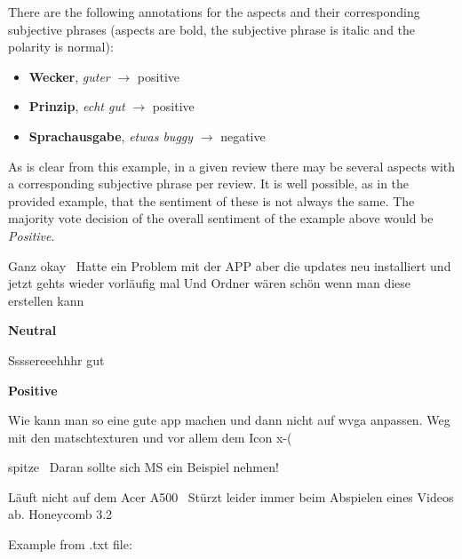 There are the following annotations for the aspects and their corresponding subjective phrases
(aspects are bold, the subjective phrase is italic and the polarity is normal):


\begin{itemize}
  \item \textbf{Wecker}, \textit{guter} $\rightarrow$ positive
  \item \textbf{Prinzip}, \textit{echt gut} $\rightarrow$ positive
  \item \textbf{Sprachausgabe}, \textit{etwas buggy} $\rightarrow$ negative
\end{itemize}

As is clear from this example, in a given review there may be several aspects with a corresponding
subjective phrase per review.
It is well possible, as in the provided example, that the sentiment of these is not always the
same.
The majority vote decision of the overall sentiment of the example above would be \emph{Positive}.

\begin{examples}
  \item Ganz okay \textbar\textbar\ Hatte ein Problem mit der APP aber die updates neu installiert und jetzt gehts wieder vorläufig mal Und Ordner wären schön wenn man diese erstellen kann

        \textbf{Neutral}
  \item Ssssereeehhhr gut

        \textbf{Positive}
  \item Wie kann man so eine gute app machen und dann nicht auf wvga anpassen. Weg mit den matschtexturen und vor allem dem Icon x-(
  \item spitze \textbar\textbar\ Daran sollte sich MS ein Beispiel nehmen!
  \item Läuft nicht auf dem Acer A500 \textbar\textbar\ Stürzt leider immer beim Abspielen eines Videos ab. Honeycomb 3.2
\end{examples}


Example from .txt file:

